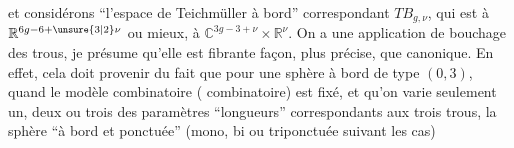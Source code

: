 
et considérons ``l'espace de Teichmüller à bord'' correspondant  $TB_{g,\nu}$, qui est   à $\mathbb R^{6g-6+\unsure{3|2}\nu}$ ou mieux, à $\mathbb C^{3g-3+\nu}\times\mathbb R^\nu$. On a une application
de bouchage des trous, je présume qu'elle est fibrante  façon, plus précise, que   canonique.  En effet, cela doit provenir du fait que pour une sphère  à bord de type $(0,3)$,  quand le modèle combinatoire ( combinatoire) est fixé, et qu'on varie seulement  un, deux ou trois des paramètres ``longueurs'' correspondants aux trois trous, la sphère ``à bord et ponctuée'' (mono, bi ou triponctuée suivant les cas)  
